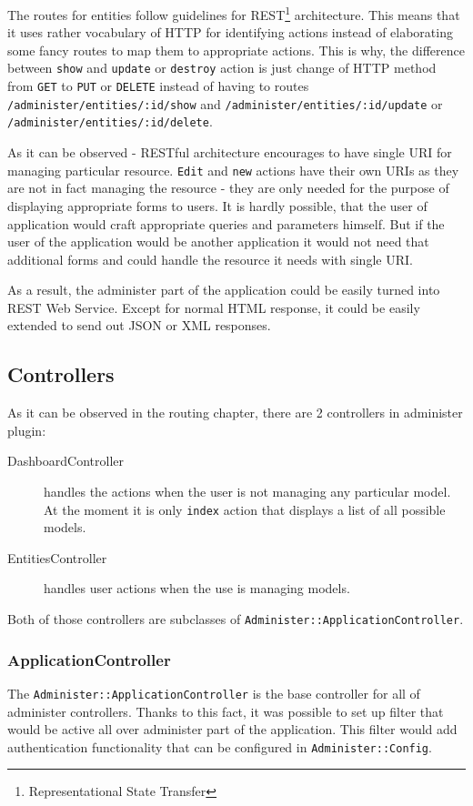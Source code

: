       The routes for entities follow guidelines for REST\footnote{Representational State Transfer} architecture.
      This means that it uses rather vocabulary of HTTP for identifying actions instead of elaborating
      some fancy routes to map them to appropriate actions. This is why, the difference between
      \texttt{show} and \texttt{update} or \texttt{destroy} action is just change of HTTP method from \texttt{GET} to
      \texttt{PUT} or \texttt{DELETE} instead of having to routes \texttt{/administer/entities/:id/show} and
      \texttt{/administer/entities/:id/update} or \texttt{/administer/entities/:id/delete}.

      As it can be observed - RESTful architecture encourages to have single URI for managing particular
      resource. \texttt{Edit} and \texttt{new} actions have their own URIs as they are not in fact
      managing the resource - they are only needed for the purpose of displaying appropriate forms
      to users. It is hardly possible, that the user of application would craft appropriate queries
      and parameters himself. But if the user of the application would be another application
      it would not need that additional forms and could handle the resource it needs with 
      single URI.
    
      As a result, the administer part of the application could be easily turned into REST Web Service. 
      Except for normal HTML response, it could be easily extended to send out JSON or XML responses.
    
    \subsection{Controllers}
      As it can be observed in the routing chapter, there are 2 controllers in administer plugin:
      \begin{description}
        \item[DashboardController] handles the actions when the user is not managing 
          any particular model. At the moment it is only \texttt{index} action that displays 
          a list of all possible models.
        \item[EntitiesController] handles user actions when the use is managing
          models. 
      \end{description}
      
      Both of those controllers are subclasses of \texttt{Administer::ApplicationController}.
      
      \subsubsection{ApplicationController}
        The \texttt{Administer::ApplicationController} is the base controller for all of administer controllers.
        Thanks to this fact, it was possible to set up filter that would be active all over administer part of the
        application. This filter would add authentication functionality that can be configured in \texttt{Administer::Config}.


